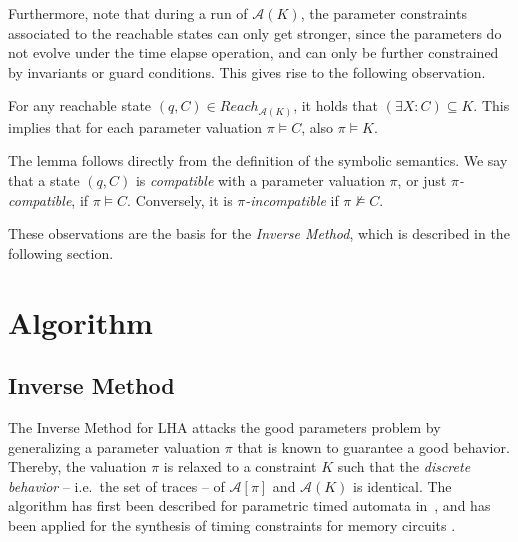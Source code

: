 \documentclass{llncs}
\newcommand{\A}{\ensuremath{\mathcal{A}}}
\begin{document}
Furthermore, note that during a run of $\A(K)$, the parameter
constraints associated to the reachable states can only get stronger,
since the parameters do not evolve under the time elapse operation,
and can only be further constrained by invariants or guard
conditions. This gives rise to the following observation.

\begin{lemma}\label{lem:narrow}
  For any reachable state $(q,C) \in Reach_{\A(K)}$, it holds that
  $(\exists X: C) \subseteq K$. This implies that for each parameter
  valuation $\pi \models C$, also $\pi \models K$. 
\end{lemma}

The lemma follows directly from the definition of the symbolic
semantics. We say that a state $(q,C)$ is \emph{compatible} with a
parameter valuation $\pi$, or just \emph{$\pi$-compatible}, if $\pi
\models C$. Conversely, it is \emph{$\pi$-incompatible} if $\pi
\not\models C$.

These observations are the basis for the \emph{Inverse Method}, which
is described in the following section.


\section{Algorithm}\label{sec:algo}
\subsection{Inverse Method}

The Inverse Method for LHA attacks the good parameters problem by
generalizing a parameter valuation $\pi$ that is known to guarantee a
good behavior. Thereby, the valuation $\pi$ is relaxed to a constraint
$K$ such that the \emph{discrete behavior} -- i.e.~the set of
traces -- of $\A[\pi]$ and $\A(K)$ is identical. The algorithm has
first been described for parametric timed automata
in~\cite{ACEF:2009}, and has been applied for the synthesis of timing
constraints for memory circuits \cite{And:2009}.
\end{document}
